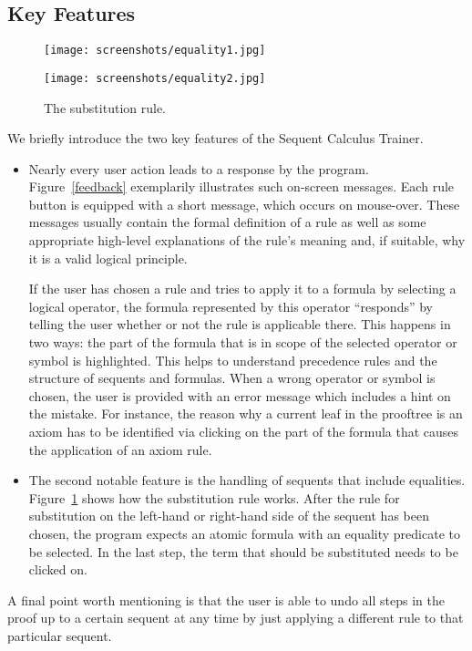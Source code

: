 \documentclass[a4paper,UKenglish]{lipics}
\begin{document}
\subsection{Key Features}

\begin{figure}[!t]
\begin{center}
\texttt{[image: screenshots/equality1.jpg]}

\vspace*{0.8em} 
\texttt{[image: screenshots/equality2.jpg]}
\caption{The substitution rule.}\label{equality}
\end{center}
\end{figure}
We briefly introduce the two key features of the Sequent Calculus Trainer. 
\begin{itemize}
\item Nearly every user action leads to a response by the program. Figure~\ref{feedback} exemplarily illustrates such on-screen messages. Each rule
  button is equipped with a short message, which occurs on mouse-over. These messages usually contain the formal definition of a rule as well as
  some appropriate high-level explanations of the rule's meaning and, if suitable, why it is a valid logical principle. 

  If the user has chosen a rule and tries to apply it to a formula by selecting a logical operator, the formula represented by this operator ``responds'' 
  by telling the user whether or not the rule is applicable there. This happens in two ways: the part of the formula that is in scope of the selected 
  operator or symbol is highlighted. This helps to understand precedence rules and the structure of sequents and formulas.  When a wrong operator or 
  symbol is chosen, the user is provided with an error message which includes a hint on the mistake. For instance, the reason why a current leaf in 
  the prooftree is an axiom has to be identified via clicking on the part of the formula that causes the application of an axiom rule.

\item The second notable feature is the handling of sequents that include equalities. Figure~\ref{equality} shows how the substitution rule works. 
  After the rule for substitution on the left-hand or right-hand side of the sequent has been chosen, the program expects an atomic formula with an 
  equality predicate to be selected. In the last step, the term that should be substituted needs to be clicked on.
\end{itemize}
A final point worth mentioning is that the user is able to undo all steps in the proof up to a certain sequent at any time by just applying a different 
rule to that particular sequent. 
\end{document}
